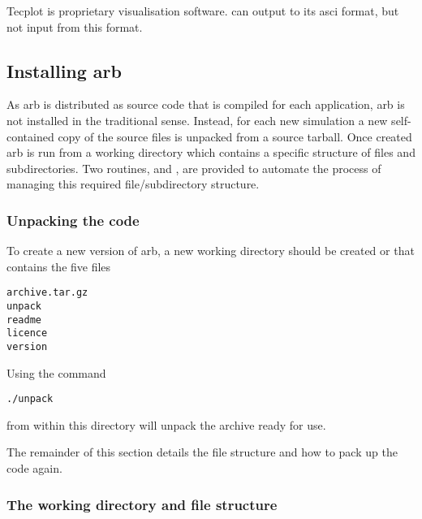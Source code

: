 \subsubsection{ \label{sec:tecplot}}

Tecplot is proprietary visualisation software.   can output to its  asci format, but not input from this format.

\subsection{Installing arb \label{sec:installing_arb}}

As arb is distributed as source code that is compiled for each application, arb is not installed in the traditional sense.  Instead, for each new simulation a new self-contained copy of the source files is unpacked from a source tarball.  Once created arb is run from a working directory which contains a specific structure of files and subdirectories.  Two routines,  and , are provided to automate the process of managing this required file/subdirectory structure.

\subsubsection{Unpacking the code}

To create a new version of arb, a new working directory should be created or  that contains the five files
%
\begin{verbatim}
archive.tar.gz
unpack
readme
licence
version
\end{verbatim}
%
Using the command
%
\begin{verbatim}
./unpack
\end{verbatim}
%
from within this directory will unpack the archive ready for use.

The remainder of this section details the file structure and how to pack up the code again.

\subsubsection{The working directory and file structure}

